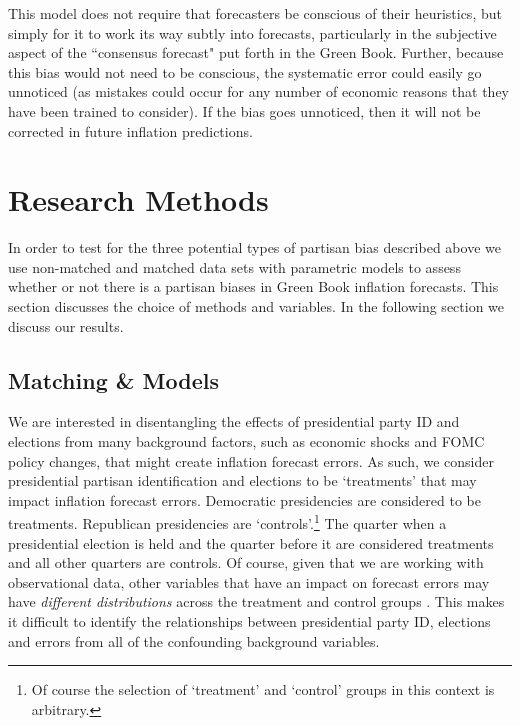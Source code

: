 \documentclass[a4paper]{article}
\begin{document}
This model does not require that forecasters be conscious of their heuristics, but simply for it to work its way subtly into forecasts, particularly in the subjective aspect of the ``consensus forecast" put forth in the Green Book. Further, because this bias would not need to be conscious, the systematic error could easily go unnoticed (as mistakes could occur for any number of economic reasons that they have been trained to consider). If the bias goes unnoticed, then it will not be corrected in future inflation predictions. %



\section{Research Methods}

In order to test for the three potential types of partisan bias described above we use non-matched and matched data sets with parametric models \citep[see][]{Ho2007} to assess whether or not there is a partisan biases in Green Book inflation forecasts. This section discusses the choice of methods and variables. In the following section we discuss our results.

\subsection{Matching \& Models}

We are interested in disentangling the effects of presidential party ID and elections from  many background factors, such as economic shocks and FOMC policy changes, that might create inflation forecast errors. As such, we consider presidential partisan identification and elections to be `treatments' that may impact inflation forecast errors. Democratic presidencies are considered to be treatments. Republican presidencies are `controls'.\footnote{Of course the selection of `treatment' and `control' groups in this context is arbitrary.} The quarter when a presidential election is held and the quarter before it are considered treatments and all other quarters are controls. Of course, given that we are working with observational data, other variables that have an impact on forecast errors may have {\emph{different distributions}} across the treatment and control groups \citep{Cochran1973, Diamond2012}. This makes it difficult to identify the relationships between presidential party ID, elections and errors from all of the confounding background variables.
\end{document}
